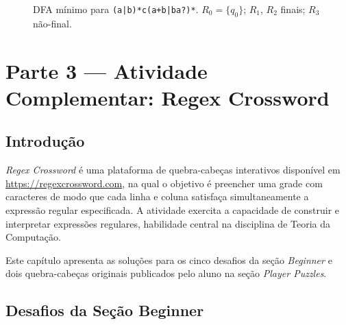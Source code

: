 \documentclass[sumario=abnt-6027-2012]{ifes8}
\newcommand{\rx}[1]{\texttt{#1}}
\begin{document}
\begin{figure}[H]
  \centering
  \caption{DFA mínimo para \rx{(a|b)*c(a+b|ba?)*}.
    $R_0{=}\{q_0\}$; $R_1$, $R_2$ finais; $R_3$ não-final.}
  \label{fig:dfa-regex5}
\end{figure}

\chapter{Parte 3 --- Atividade Complementar: Regex Crossword}

\section{Introdução}

\textit{Regex Crossword} é uma plataforma de quebra-cabeças interativos
disponível em \url{https://regexcrossword.com}, na qual o objetivo é
preencher uma grade com caracteres de modo que cada linha e coluna
satisfaça simultaneamente a expressão regular especificada. A atividade
exercita a capacidade de construir e interpretar expressões regulares,
habilidade central na disciplina de Teoria da Computação.

Este capítulo apresenta as soluções para os cinco desafios da seção
\textit{Beginner} e dois quebra-cabeças originais publicados pelo aluno
na seção \textit{Player Puzzles}.

\section{Desafios da Seção Beginner}
\end{document}
